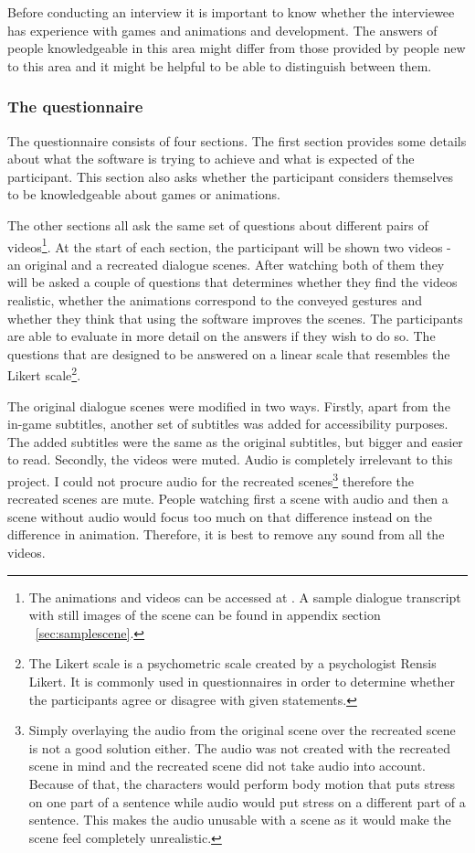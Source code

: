 Before conducting an interview it is important to know whether the interviewee has experience with games and animations and development. The answers of people knowledgeable in this area might differ from those provided by people new to this area and it might be helpful to be able to distinguish between them.

\medskip
\subsubsection{The questionnaire}
The questionnaire consists of four sections. The first section provides some details about what the software is trying to achieve and what is expected of the participant. This section also asks whether the participant considers themselves to be knowledgeable about games or animations.

The other sections all ask the same set of questions about different pairs of videos\footnote{The animations and videos can be accessed at \videoshost. A sample dialogue transcript with still images of the scene can be found in appendix section ~\ref{sec:samplescene}.}. At the start of each section, the participant will be shown two videos - an original and a recreated dialogue scenes. After watching both of them they will be asked a couple of questions that determines whether they find the videos realistic, whether the animations correspond to the conveyed gestures and whether they think that using the software improves the scenes. The participants are able to evaluate in more detail on the answers if they wish to do so. The questions that are designed to be answered on a linear scale that resembles the Likert scale\footnote{The Likert scale is a psychometric scale created by a psychologist Rensis Likert. It is commonly used in questionnaires in order to determine whether the participants agree or disagree with given statements.}.

The original dialogue scenes were modified in two ways. Firstly, apart from the in-game subtitles, another set of subtitles was added for accessibility purposes. The added subtitles were the same as the original subtitles, but bigger and easier to read. Secondly, the videos were muted. Audio is completely irrelevant to this project. I could not procure audio for the recreated scenes\footnote{Simply overlaying the audio from the original scene over the recreated scene is not a good solution either. The audio was not created with the recreated scene in mind and the recreated scene did not take audio into account. Because of that, the characters would perform body motion that puts stress on one part of a sentence while audio would put stress on a different part of a sentence. This makes the audio unusable with a scene as it would make the scene feel completely unrealistic.} therefore the recreated scenes are mute. People watching first a scene with audio and then a scene without audio would focus too much on that difference instead on the difference in animation. Therefore, it is best to remove any sound from all the videos.

